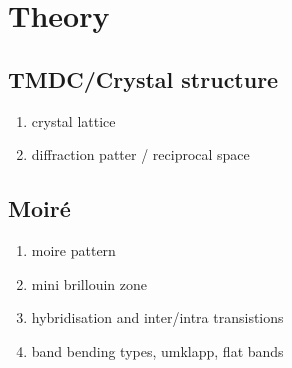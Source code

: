 \section{Theory}
\subsection{TMDC/Crystal structure}
\begin{enumerate}
    \item crystal lattice
    \item diffraction patter / reciprocal space
\end{enumerate}
\subsection{Moiré}
\begin{enumerate}
    \item moire pattern
    \item mini brillouin zone
    \item hybridisation and inter/intra transistions
    \item band bending types, umklapp,  flat bands
\end{enumerate}



